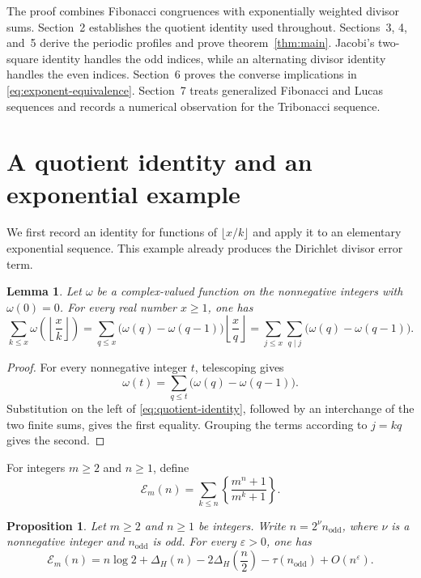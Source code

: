 \documentclass[11pt]{article}
\newtheorem{proposition}[theorem]{Proposition}
\newtheorem{lemma}[theorem]{Lemma}
\newcommand{\EE}{\mathcal E}
\newcommand{\eps}{\varepsilon}
\begin{document}
The proof combines Fibonacci congruences with exponentially weighted
divisor sums. Section~2 establishes the quotient identity used throughout.
Sections~3, 4, and~5 derive the periodic profiles and prove
theorem~\ref{thm:main}. Jacobi's two-square identity handles the odd indices,
while an alternating divisor identity handles the even indices. Section~6
proves the converse implications in \eqref{eq:exponent-equivalence}.
Section~7 treats generalized Fibonacci and Lucas sequences and records a
numerical observation for the Tribonacci sequence.

\section{A quotient identity and an exponential example}

We first record an identity for functions of $\lfloor x/k\rfloor$ and apply it
to an elementary exponential sequence. This example already produces the
Dirichlet divisor error term.

\begin{lemma}\label{lem:quotient}
Let $\omega$ be a complex-valued function on the nonnegative integers with
$\omega(0)=0$. For every real number $x\geq 1$, one has
\begin{equation}\label{eq:quotient-identity}
 \sum_{k\leq x}\omega\left(\left\lfloor\frac{x}{k}\right\rfloor\right)
 =\sum_{q\leq x}\bigl(\omega(q)-\omega(q-1)\bigr)
  \left\lfloor\frac{x}{q}\right\rfloor
 =\sum_{j\leq x}\sum_{q\mid j}\bigl(\omega(q)-\omega(q-1)\bigr).
\end{equation}
\end{lemma}

\begin{proof}
For every nonnegative integer $t$, telescoping gives
\[
 \omega(t)=\sum_{q\leq t}\bigl(\omega(q)-\omega(q-1)\bigr).
\]
Substitution on the left of \eqref{eq:quotient-identity}, followed by an
interchange of the two finite sums, gives the first equality. Grouping the
terms according to $j=kq$ gives the second.
\end{proof}

For integers $m\geq 2$ and $n\geq 1$, define
\begin{equation}\label{eq:def-exp-sum}
 \EE_m(n)=\sum_{k\leq n}
 \left\{\frac{m^n+1}{m^k+1}\right\}.
\end{equation}
\begin{proposition}\label{prop:exponential}
Let $m\geq 2$ and $n\geq 1$ be integers. Write
$n=2^\nu n_{\mathrm{odd}}$, where $\nu$ is a nonnegative integer and
$n_{\mathrm{odd}}$ is odd. For every $\eps>0$, one has
\begin{equation}\label{eq:exp-remainder}
 \EE_m(n)=n\log 2+\Delta_H(n)-2\Delta_H\left(\frac n2\right)
 -\tau(n_{\mathrm{odd}})+O(n^\eps).
\end{equation}
\end{proposition}
\end{document}
